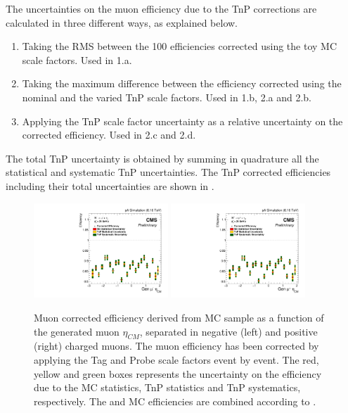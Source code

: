 The uncertainties on the muon efficiency due to the TnP corrections are calculated in three different ways, as explained below.

\begin{enumerate}
   \item Taking the RMS between the 100 efficiencies corrected using the toy MC scale factors. Used in 1.a.
   \item Taking the maximum difference between the efficiency corrected using the nominal and the varied TnP scale factors. Used in 1.b, 2.a and 2.b.
   \item Applying the TnP scale factor uncertainty as a relative uncertainty on the corrected efficiency. Used in 2.c and 2.d.
\end{enumerate}

The total TnP uncertainty is obtained by summing in quadrature all the statistical and systematic TnP uncertainties. The TnP corrected efficiencies including their total uncertainties are shown in .

\begin{figure}[htb!]
 \begin{center}
  \includegraphics[width=0.45\textwidth]{Figures/WBoson/Analysis/Efficiency/Muon/PA/eff1D_EtaCM_MC_WToMuNu_PA_Minus_Total_TnP_Nominal}
  \includegraphics[width=0.45\textwidth]{Figures/WBoson/Analysis/Efficiency/Muon/PA/eff1D_EtaCM_MC_WToMuNu_PA_Plus_Total_TnP_Nominal}
 \end{center}
 \caption{Muon corrected efficiency derived from \WToMuNu \POWHEG MC sample as a function of the generated muon $\eta_{CM}$, separated in negative (left) and positive (right) charged muons. The muon efficiency has been corrected by applying the Tag and Probe scale factors event by event. The red, yellow and green boxes represents the uncertainty on the efficiency due to the MC statistics, TnP statistics and TnP systematics, respectively. The \RunpPb and \RunPbp MC efficiencies are combined according to .}
 \label{fig:CorrEfficiency}
\end{figure}


